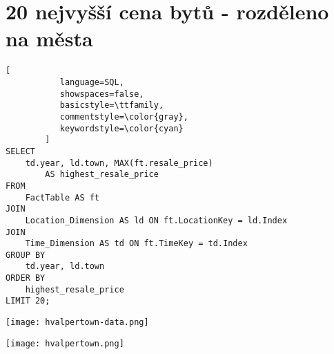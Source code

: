 \section{20 nejvyšší cena bytů - rozděleno na města}

\begin{lstlisting}[
           language=SQL,
           showspaces=false,
           basicstyle=\ttfamily,
           commentstyle=\color{gray},
           keywordstyle=\color{cyan}
        ]
SELECT 
    td.year, ld.town, MAX(ft.resale_price) 
        AS highest_resale_price
FROM 
    FactTable AS ft
JOIN 
    Location_Dimension AS ld ON ft.LocationKey = ld.Index
JOIN 
    Time_Dimension AS td ON ft.TimeKey = td.Index
GROUP BY 
    td.year, ld.town
ORDER BY 
    highest_resale_price
LIMIT 20;
\end{lstlisting}

\texttt{[image: hvalpertown-data.png]}

\texttt{[image: hvalpertown.png]}

